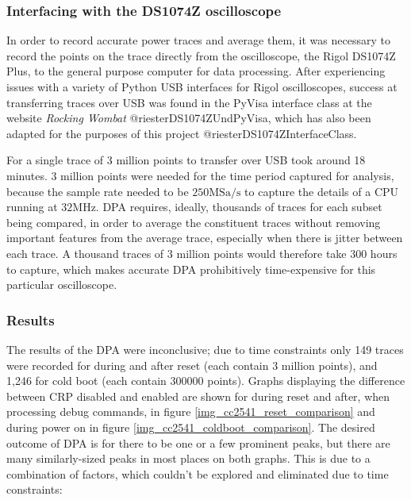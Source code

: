 \hypertarget{interfacing-with-the-ds1074z-oscilloscope}{%
\subsubsection{Interfacing with the DS1074Z
oscilloscope}\label{interfacing-with-the-ds1074z-oscilloscope}}

In order to record accurate power traces and average them, it was
necessary to record the points on the trace directly from the
oscilloscope, the Rigol DS1074Z Plus, to the general purpose computer
for data processing. After experiencing issues with a variety of Python
USB interfaces for Rigol oscilloscopes, success at transferring traces
over USB was found in the PyVisa interface class at the website
\emph{Rocking Wombat} @riesterDS1074ZUndPyVisa, which has also been
adapted for the purposes of this project @riesterDS1074ZInterfaceClass.

For a single trace of 3 million points to transfer over USB took around
18 minutes. 3 million points were needed for the time period captured
for analysis, because the sample rate needed to be \(250\textrm{MSa/s}\)
to capture the details of a CPU running at \(32\si{\mega\hertz}\). DPA
requires, ideally, thousands of traces for each subset being compared,
in order to average the constituent traces without removing important
features from the average trace, especially when there is jitter between
each trace. A thousand traces of 3 million points would therefore take
300 hours to capture, which makes accurate DPA prohibitively
time-expensive for this particular oscilloscope.

\hypertarget{results}{%
\subsubsection{Results}\label{results}}

The results of the DPA were inconclusive; due to time constraints only
149 traces were recorded for during and after reset (each contain 3
million points), and 1,246 for cold boot (each contain \(300000\)
points). Graphs displaying the difference between CRP disabled and
enabled are shown for during reset and after, when processing debug
commands, in figure \ref{img_cc2541_reset_comparison} and during power
on in figure \ref{img_cc2541_coldboot_comparison}. The desired outcome
of DPA is for there to be one or a few prominent peaks, but there are
many similarly-sized peaks in most places on both graphs. This is due to
a combination of factors, which couldn't be explored and eliminated due
to time constraints:

